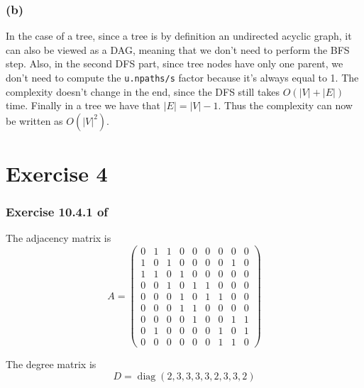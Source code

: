 \documentclass{article}
\DeclareMathOperator{\diag}{\textrm{diag}}
\begin{document}
\subsubsection*{(b)}
In the case of a tree,
since a tree is by definition an undirected acyclic graph,
it can also be viewed as a DAG,
meaning that we don't need to perform the BFS step.
Also, in the second DFS part, since tree nodes have only one parent,
we don't need to compute the \verb|u.npaths/s| factor
because it's always equal to 1.
The complexity doesn't change in the end,
since the DFS still takes \(O(|V| + |E|)\) time.
Finally in a tree we have that $|E| = |V| - 1$.
Thus the complexity can now be written as \(O(|V|^2)\).


\section*{Exercise 4}

\subsubsection*{Exercise 10.4.1 of \cite{mmds}}

The adjacency matrix is
\begin{equation*}
    A = \begin{pmatrix}
        0 & 1 & 1 & 0 & 0 & 0 & 0 & 0 & 0\\
        1 & 0 & 1 & 0 & 0 & 0 & 0 & 1 & 0\\
        1 & 1 & 0 & 1 & 0 & 0 & 0 & 0 & 0\\
        0 & 0 & 1 & 0 & 1 & 1 & 0 & 0 & 0\\
        0 & 0 & 0 & 1 & 0 & 1 & 1 & 0 & 0\\
        0 & 0 & 0 & 1 & 1 & 0 & 0 & 0 & 0\\
        0 & 0 & 0 & 0 & 1 & 0 & 0 & 1 & 1\\
        0 & 1 & 0 & 0 & 0 & 0 & 1 & 0 & 1\\
        0 & 0 & 0 & 0 & 0 & 0 & 1 & 1 & 0
    \end{pmatrix}
\end{equation*}

The degree matrix is
\begin{equation*}
    D = \diag(2,3,3,3,3,2,3,3,2)
\end{equation*}
\end{document}
